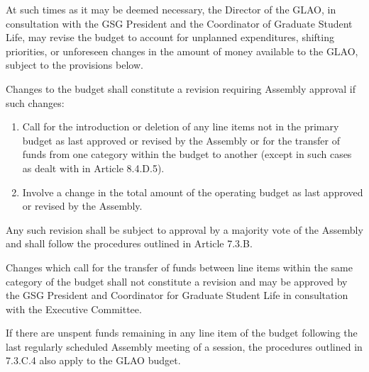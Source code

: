 \begin{bylaws-number}
\begin{bylaws-number}
    \item At such times as it may be deemed necessary, the Director of the GLAO, in consultation with the GSG President and the Coordinator of Graduate Student Life, may revise the budget to account for unplanned expenditures, shifting priorities, or unforeseen changes in the amount of money available to the GLAO, subject to the provisions below.
    \item Changes to the budget shall constitute a revision requiring Assembly approval if such changes:
    \begin{enumerate}[i]
      \item Call for the introduction or deletion of any line items not in the primary budget as last approved or revised by the Assembly or for the transfer of funds from one category within the budget to another (except in such cases as dealt with in Article 8.4.D.5).
      \item Involve a change in the total amount of the operating budget as last approved or revised by the Assembly.
    \end{enumerate}
    \item Any such revision shall be subject to approval by a majority vote of the Assembly and shall follow the procedures outlined in Article 7.3.B.
    \item Changes which call for the transfer of funds between line items within the same category of the budget shall not constitute a revision and may be approved by the GSG President and Coordinator for Graduate Student Life in consultation with the Executive Committee.
    \item If there are unspent funds remaining in any line item of the budget following the last regularly scheduled Assembly meeting of a session, the procedures outlined in 7.3.C.4 also apply to the GLAO budget.
  \end{bylaws-number}
\end{bylaws-number}